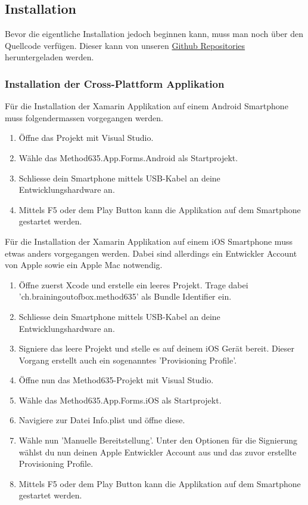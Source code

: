 \subsection{Installation}
Bevor die eigentliche Installation jedoch beginnen kann, muss man noch über den Quellcode verfügen. Dieser kann von unseren \href{https://github.com/BrainingOutOfBox}{Github Repositories} heruntergeladen werden.

\subsubsection*{Installation der Cross-Plattform Applikation}
\label{subsub:installation}
Für die Installation der Xamarin Applikation auf einem Android Smartphone muss folgendermassen vorgegangen werden.

\begin{enumerate}
  \item Öffne das Projekt mit Visual Studio.
  \item Wähle das \grqq Method635.App.Forms.Android \grqq als Startprojekt.
  \item Schliesse dein Smartphone mittels USB-Kabel an deine Entwicklungshardware an.
  \item Mittels F5 oder dem Play Button kann die Applikation auf dem Smartphone gestartet werden.
\end{enumerate}
Für die Installation der Xamarin Applikation auf einem iOS Smartphone muss etwas anders vorgegangen werden. Dabei sind allerdings ein Entwickler Account von Apple sowie ein Apple Mac notwendig.

\begin{enumerate}
  \item Öffne zuerst Xcode und erstelle ein leeres Projekt. Trage dabei 'ch.brainingoutofbox\-.method635' als Bundle Identifier ein.
  \item Schliesse dein Smartphone mittels USB-Kabel an deine Entwicklungshardware an.
  \item Signiere das leere Projekt und stelle es auf deinem iOS Gerät bereit. Dieser Vorgang erstellt auch ein sogenanntes 'Provisioning Profile'. 
  \item Öffne nun das Method635-Projekt mit Visual Studio.
  \item Wähle das \grqq Method635.App.Forms.iOS \grqq als Startprojekt.
  \item Navigiere zur Datei Info.plist und öffne diese.
  \item Wähle nun 'Manuelle Bereitstellung'. Unter den Optionen für die Signierung wählst du nun deinen Apple Entwickler Account aus und das zuvor erstellte Provisioning Profile.
  \item Mittels F5 oder dem Play Button kann die Applikation auf dem Smartphone gestartet werden. 
  \end{enumerate}

